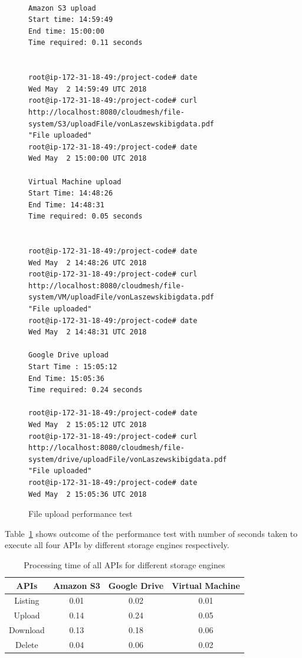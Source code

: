 \begin{figure}[!ht]
\begin{footnotesize}
\begin{verbatim}

Amazon S3 upload 
Start time: 14:59:49		
End time: 15:00:00
Time required: 0.11 seconds


root@ip-172-31-18-49:/project-code# date
Wed May  2 14:59:49 UTC 2018
root@ip-172-31-18-49:/project-code# curl http://localhost:8080/cloudmesh/file-system/S3/uploadFile/vonLaszewskibigdata.pdf
"File uploaded"
root@ip-172-31-18-49:/project-code# date
Wed May  2 15:00:00 UTC 2018

Virtual Machine upload
Start Time: 14:48:26		
End Time: 14:48:31
Time required: 0.05 seconds


root@ip-172-31-18-49:/project-code# date
Wed May  2 14:48:26 UTC 2018
root@ip-172-31-18-49:/project-code# curl http://localhost:8080/cloudmesh/file-system/VM/uploadFile/vonLaszewskibigdata.pdf
"File uploaded"
root@ip-172-31-18-49:/project-code# date
Wed May  2 14:48:31 UTC 2018

Google Drive upload
Start Time : 15:05:12		
End Time: 15:05:36
Time required: 0.24 seconds

root@ip-172-31-18-49:/project-code# date
Wed May  2 15:05:12 UTC 2018
root@ip-172-31-18-49:/project-code# curl http://localhost:8080/cloudmesh/file-system/drive/uploadFile/vonLaszewskibigdata.pdf
"File uploaded"
root@ip-172-31-18-49:/project-code# date
Wed May  2 15:05:36 UTC 2018

\end{verbatim}
\end{footnotesize}
\caption{File upload performance test}\label{fig:upload-test}
\end{figure}


Table~\ref{tab:timing} shows outcome of the performance test 
with number of seconds taken to execute all four APIs by different 
storage engines respectively.

\begin{table}[htb]
	\centering
  \caption{Processing time of all APIs for different storage 
  engines}\label{tab:timing}

	\begin{tabular}{*{4}{c}}
		\toprule
		APIs & Amazon S3 & Google Drive & Virtual Machine \\
		\midrule
		Listing & 0.01  & 0.02 & 0.01 \\
		Upload & 0.14 & 0.24 & 0.05 \\
    Download & 0.13 & 0.18 & 0.06 \\
    Delete & 0.04 & 0.06 & 0.02 \\
		\bottomrule
	\end{tabular}
\end{table}




